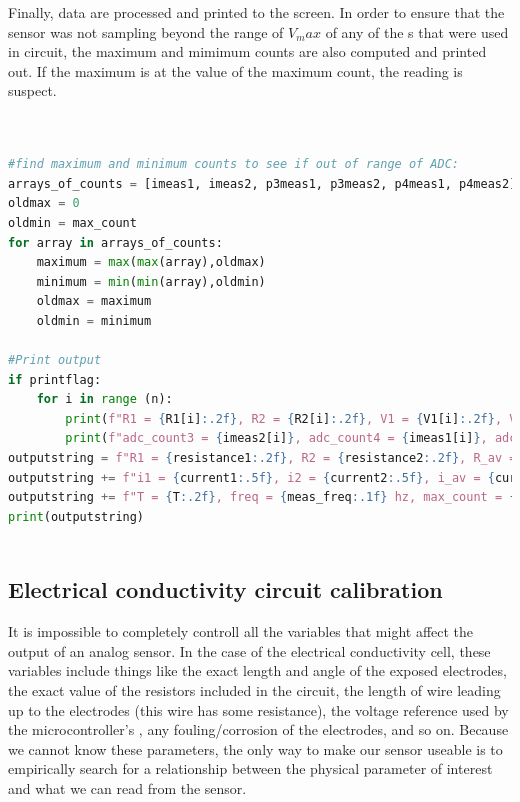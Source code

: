 {\begin{lstlisting}[language=Python]
\end{lstlisting}

Finally, data are processed and printed to the screen. In order to ensure that the sensor was not sampling beyond the range of $V_max$ of any of the \adc s that were used in circuit, the maximum and mimimum \adc counts are also computed and printed out.  If the maximum is at the value of the maximum count, the reading is suspect.

\begin{lstlisting}[language=Python]

    
#find maximum and minimum counts to see if out of range of ADC:
arrays_of_counts = [imeas1, imeas2, p3meas1, p3meas2, p4meas1, p4meas2]
oldmax = 0
oldmin = max_count
for array in arrays_of_counts:
    maximum = max(max(array),oldmax)
    minimum = min(min(array),oldmin)
    oldmax = maximum
    oldmin = minimum

#Print output
if printflag:
    for i in range (n):
        print(f"R1 = {R1[i]:.2f}, R2 = {R2[i]:.2f}, V1 = {V1[i]:.2f}, V2 = {V2[i]:.2f}, i1 = {i1[i]:.2f}, i2 = {i2[i]:.2f}")
        print(f"adc_count3 = {imeas2[i]}, adc_count4 = {imeas1[i]}, adc1_1 = {p3meas1[i]}, acd1_2 = {p4meas1[i]}, adc2_1 = {p4meas1[i]}, adc2_2 = {p4meas2[i]}")
outputstring = f"R1 = {resistance1:.2f}, R2 = {resistance2:.2f}, R_av = {resistance_average:.2f}, "
outputstring += f"i1 = {current1:.5f}, i2 = {current2:.5f}, i_av = {current_average:.5f}, "
outputstring += f"T = {T:.2f}, freq = {meas_freq:.1f} hz, max_count = {maximum}, min_count = {minimum}"
print(outputstring)
    
\end{lstlisting}


\subsection{Electrical conductivity circuit calibration}

It is impossible to completely controll all the variables that might affect the output of an analog sensor. In the case of the electrical conductivity cell, these variables include things like the exact length and angle of the exposed electrodes, the exact value of the resistors included in the circuit, the length of wire leading up to the electrodes (this wire has some resistance), the voltage reference used by the microcontroller's \adc, any fouling/corrosion of the electrodes, and so on.  Because we cannot know these parameters, the only way to make our sensor useable is to empirically search for a relationship between the physical parameter of interest and what we can read from the sensor.

}
